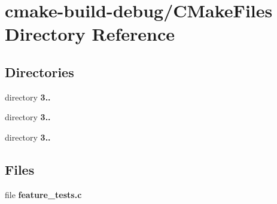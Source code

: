 \section{cmake-\/build-\/debug/\+C\+Make\+Files Directory Reference}
\label{dir_f89abcb304c928c7d889aa5625570de5}
\subsection*{Directories}
\begin{DoxyCompactItemize}
\item 
directory {\bf 3..}
\item 
directory {\bf 3..}
\item 
directory {\bf 3..}
\end{DoxyCompactItemize}
\subsection*{Files}
\begin{DoxyCompactItemize}
\item 
file {\bf feature\+\_\+tests.\+c}
\end{DoxyCompactItemize}

